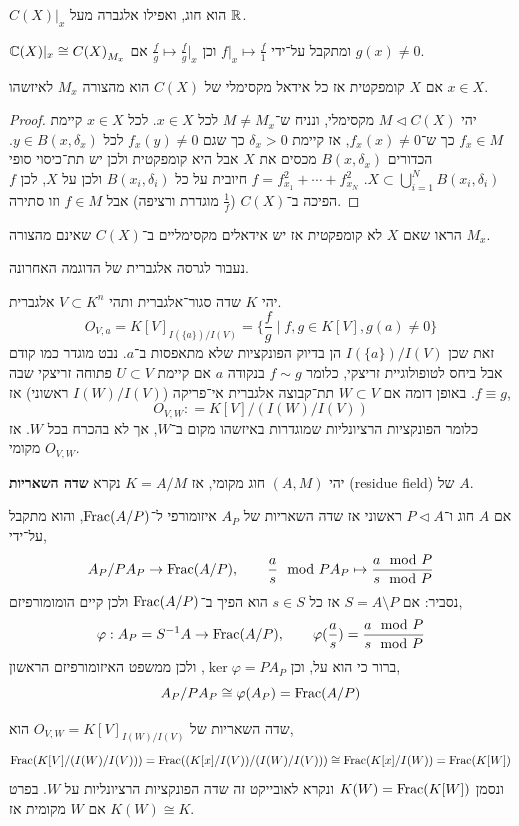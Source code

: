 $C(X) |_x$ הוא חוג, ואפילו אלגברה מעל $\mathbb{R}$.
\begin{example}
	$\mathbb{C}(X) |_x \cong {C(X)}_{M_x}$ ומתקבל על־ידי $f |_x \mapsto \frac{f}{1}$ וכן $\frac{f}{g} \mapsto \frac{f}{g} |_x$ אם $g(x) \ne 0$.
\end{example}
\begin{proposition}
	אם $X$ קומפקטית אז כל אידאל מקסימלי של $C(X)$ הוא מהצורה $M_x$ לאיזשהו $x \in X$.
\end{proposition}
\begin{proof}
	יהי $M \triangleleft C(X)$ מקסימלי, ונניח ש־$M \ne M_x$ לכל $x \in X$.
	לכל $x \in X$ קיימת $f_x \in M$ כך ש־$f_x(x) \ne 0$, אז קיימת $\delta_x > 0$ כך שגם $f_x(y) \ne 0$ לכל $y \in B(x, \delta_x)$.
	הכדורים $B(x, \delta_x)$ מכסים את $X$ אבל היא קומפקטית ולכן יש תת־כיסוי סופי $X \subset \bigcup_{i = 1}^N B(x_i, \delta_i)$.
	$f = f_{x_1}^2 + \cdots + f_{x_N}^2$ חיובית על כל $B(x_i, \delta_i)$ ולכן על $X$, לכן $f$ הפיכה ב־$C(X)$ ($\frac{1}{f}$ מוגדרת ורציפה) אבל $f \in M$ וזו סתירה.
\end{proof}
\begin{exercise}
	הראו שאם $X$ לא קומפקטית אז יש אידאלים מקסימליים ב־$C(X)$ שאינם מהצורה $M_x$.
\end{exercise}
נעבור לגרסה אלגברית של הדוגמה האחרונה.
\begin{example}
	יהי $K$ שדה סגור־אלגברית ותהי $V \subset K^n$ אלגברית.
	\[
		O_{V, a}
		= {K[V]}_{I(\{ a \}) / I(V)}
		= \{ \frac{f}{g} \mid f, g \in K[V], g(a) \ne 0 \}
	\]
	זאת שכן $I(\{ a \}) / I(V)$ הן בדיוק הפונקציות שלא מתאפסות ב־$a$.
	נבט מוגדר כמו קודם אבל ביחס לטופולוגיית זריצקי, כלומר $f \sim g$ בנקודה $a$ אם קיימת $U \subset V$ פתוחה זריצקי שבה $f \equiv g$.
	באופן דומה אם $W \subset V$ תת־קבוצה אלגברית אי־פריקה ($I(W) / I(V)$ ראשוני) אז,
	\[
		O_{V, W}
		: = K[V] / (I(W) / I(V))
	\]
	כלומר הפונקציות הרציונליות שמוגדרות באיזשהו מקום ב־$W$, אך לא בהכרח בכל $W$.
	אז $O_{V, W}$ מקומי.
\end{example}
\begin{notation}
	יהי $(A, M)$ חוג מקומי, אז $K = A / M$ נקרא \textbf{שדה השאריות} (residue field) של $A$.
\end{notation}
\begin{remark}
	אם $A$ חוג ו־$P \triangleleft A$ ראשוני אז שדה השאריות של $A_P$ איזומורפי ל־$\operatorname{Frac}(A / P)$, והוא מתקבל על־ידי,
	\[
		A_P / P A_P \to \operatorname{Frac}(A / P),
		\qquad
		\frac{a}{s} \mod P A_P
		\mapsto \frac{a \mod P}{s \mod P}
	\]
	נסביר:
	אם $S = A \setminus P$ אז כל $s \in S$ הוא הפיך ב־$\operatorname{Frac}(A / P)$ ולכן קיים הומומורפיזם,
	\[
		\varphi : A_P = S^{-1} A \to \operatorname{Frac}(A / P),
		\qquad
		\varphi(\frac{a}{s})
		= \frac{a \mod P}{s \mod P}
	\]
	ברור כי הוא על, וכן $\ker \varphi = P A_P$, ולכן ממשפט האיזומורפיזם הראשון,
	\[
		A_P / P A_P
		\cong \varphi(A_P)
		= \operatorname{Frac}(A / P)
	\]
\end{remark}
\begin{example}
	שדה השאריות של $O_{V, W} = {K[V]}_{I(W) / I(V)}$ הוא,
	\[
		\operatorname{Frac}(K[V] / (I(W) / I(V)))
		= \operatorname{Frac}((K[x] / I(V)) / (I(W) / I(V)))
		\cong \operatorname{Frac}(K[x] / I(W))
		= \operatorname{Frac}(K[W])
	\]
	ונסמן $K(W) = \operatorname{Frac}(K[W])$ ונקרא לאובייקט זה שדה הפונקציות הרציונליות על $W$.
	בפרט אם $W$ מקומית אז $K(W) \cong K$.
\end{example}

